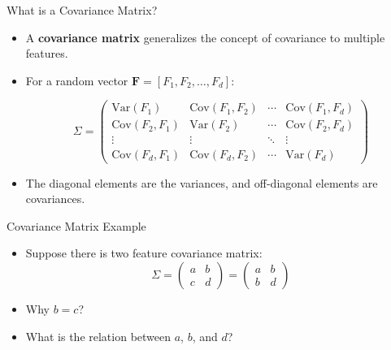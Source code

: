 \documentclass[serif, aspectratio=169]{beamer}
\begin{document}
\begin{frame}{What is a Covariance Matrix?}
    \begin{itemize}         
        \item A \textbf{covariance matrix} generalizes the concept of covariance to multiple features.
        
\item For a random vector $\mathbf{F} = [F_1, F_2, \dots, F_d]$:

$$
\Sigma = 
\begin{pmatrix}
\text{Var}(F_1) & \text{Cov}(F_1, F_2) & \cdots & \text{Cov}(F_1, F_d) \\
\text{Cov}(F_2, F_1) & \text{Var}(F_2) & \cdots & \text{Cov}(F_2, F_d) \\
\vdots & \vdots & \ddots & \vdots \\
\text{Cov}(F_d, F_1) & \text{Cov}(F_d, F_2) & \cdots & \text{Var}(F_d)
\end{pmatrix}
$$

\item The diagonal elements are the variances, and off-diagonal elements are covariances.
    \end{itemize}
\end{frame}


\begin{frame}{Covariance Matrix Example}
    \begin{itemize}         
        \item Suppose there is two feature covariance matrix:
$$
\Sigma = 
\begin{pmatrix}
a & b  \\
c & d 
\end{pmatrix} = \begin{pmatrix}
a & b   \\
b & d 
\end{pmatrix}
$$

        \item Why $b = c $?
        \item What is the relation between $a$, $b$, and $d $?
    \end{itemize}
\end{frame}
\end{document}
